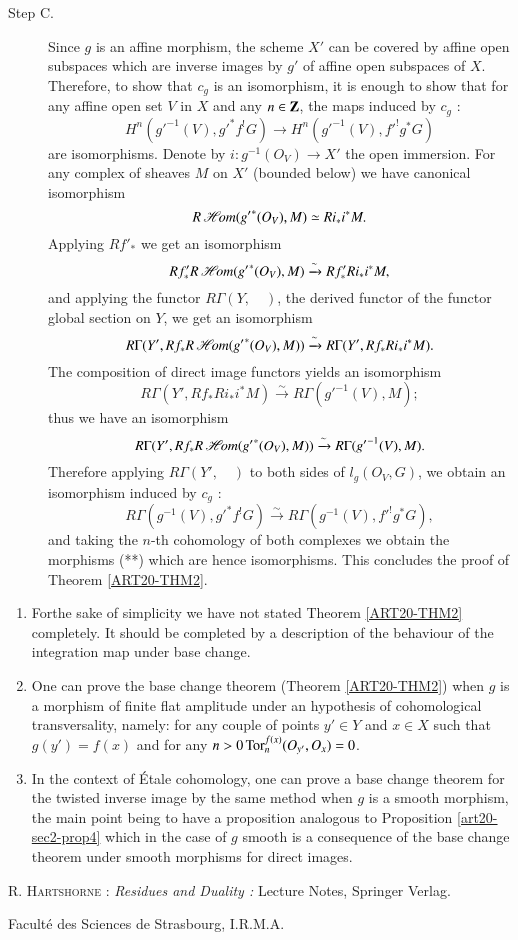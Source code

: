 \begin{description}
\item[Step C.] Since $g$ is an affine morphism, the scheme $X'$ can be covered by affine open subspaces which are inverse images by $g'$ of affine open subspaces of $X$. Therefore, to show that $c_{g}$ is an isomorphism, it is enough to show that for any affine open set $V$ in $X$ and any $n\in \mathbf{Z}$, the maps induced by $c_{g}$ :
\begin{equation*}
H^{n}({g'}^{-1}(V),{g'}^{*}f^{!}G)\to H^{n}({g'}^{-1}(V),{f'}^{!}g^{*}G)\tag{**}
\end{equation*}
are isomorphisms. Denote by $i:g^{-1}(O_{V})\to X'$ the open immersion. For any complex of sheaves $M$ on $X'$ (bounded below) we have canonical isomorphism
$$
R\operatorname{\mathscr{H}\!\textit{om}}({g'}^{*}(O_{V}), M)\simeq Ri_{*}i^{*}M.
$$
Applying $Rf'_{*}$ we get an isomorphism
$$
Rf'_{*}R\operatorname{\mathscr{H}\!\textit{om}}({g'}^{*}(O_{V}),M)\xrightarrow{\sim} Rf'_{*}Ri_{*}i^{*}M,
$$
and applying the functor $R\Gamma(Y,\quad)$, the derived functor of the functor global section on $Y$, we get an isomorphism
$$
R\Gamma(Y',Rf_{*}R\operatorname{\mathscr{H}\!\textit{om}}({g'}^{*}(O_{V}),M))\xrightarrow{\sim}R\Gamma(Y',Rf_{*}Ri_{*}i^{*}M).
$$
The composition of direct image functors yields an isomorphism
$$
R\Gamma(Y',Rf_{*}Ri_{*}i^{*}M)\xrightarrow{\sim}R\Gamma({g'}^{-1}(V),M);
$$
thus we have an isomorphism
$$
R\Gamma(Y',Rf_{*}R\operatorname{\mathscr{H}\!\textit{om}}({g'}^{*}(O_{V}),M))\xrightarrow{\sim}R\Gamma({g'}^{-1}(V),M).
$$
Therefore applying $R\Gamma(Y',\quad)$ to both sides of $l_{g}(O_{V},G)$, we obtain an isomorphism induced by $c_{g}$ :
$$
R\Gamma(g^{-1}(V),{g'}^{*}f^{!}G)\xrightarrow{\sim}R\Gamma(g^{-1}(V),{f'}^{!}g^{*}G),
$$
and taking the $n$-th cohomology of both complexes we obtain the morphisms (**) which are hence isomorphisms. This concludes the proof of Theorem \ref{ART20-THM2}.
\end{description}

\begin{remark*}
\begin{enumerate}
\renewcommand{\labelenumi}{(\theenumi)}
\item For\pageoriginale the sake of simplicity we have not stated Theorem \ref{ART20-THM2} completely. It should be completed by a description of the behaviour of the integration map under base change.

\item One can prove the base change theorem (Theorem \ref{ART20-THM2}) when $g$ is a morphism of finite flat amplitude under an hypothesis of cohomological transversality, namely: for any couple of points $y'\in Y$ and $x\in X$ such that $g(y')=f(x)$ and for any $n>0\operatorname{\mathrm{Tor}}^{f(x)}_{n}(O_{y'},O_{x})=0$.

\item In the context of \'Etale cohomology, one can prove a base change theorem for the twisted inverse image by the same method when $g$ is a smooth morphism, the main point being to have a proposition analogous to Proposition \ref{art20-sec2-prop4} which in the case of $g$ smooth is a consequence of the base change theorem under smooth morphisms for direct images.
\end{enumerate}
\end{remark*}

\begin{thebibliography}{99}
 \textsc{R. Hartshorne :} {\em Residues and Duality :} Lecture Notes, Springer Verlag. 
\end{thebibliography}

\bigskip
\noindent
{\small Facult\'e des Sciences de Strasbourg, I.R.M.A.}
